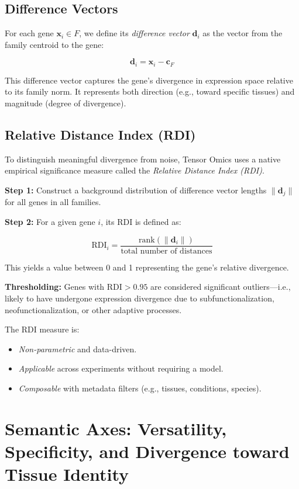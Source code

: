 \documentclass[11pt]{article}
\begin{document}
\subsection{Difference Vectors}

For each gene $\mathbf{x}_i \in F$, we define its \textit{difference vector} $\mathbf{d}_i$ as the vector from the family centroid to the gene:

\[
    \mathbf{d}_i = \mathbf{x}_i - \mathbf{c}_F
\]

This difference vector captures the gene’s divergence in expression space relative to its family norm. It represents both direction (e.g., toward specific tissues) and magnitude (degree of divergence).

\subsection{Relative Distance Index (RDI)}

To distinguish meaningful divergence from noise, Tensor Omics uses a native empirical significance measure called the \textit{Relative Distance Index (RDI)}.

\textbf{Step 1:} Construct a background distribution of difference vector lengths $\|\mathbf{d}_j\|$ for all genes in all families.

\textbf{Step 2:} For a given gene $i$, its RDI is defined as:

\[
    \text{RDI}_i = \frac{\text{rank}(\|\mathbf{d}_i\|)}{\text{total number of distances}}
\]

This yields a value between 0 and 1 representing the gene’s relative divergence.

\textbf{Thresholding:} Genes with $\text{RDI} > 0.95$ are considered significant outliers—i.e., likely to have undergone expression divergence due to subfunctionalization, neofunctionalization, or other adaptive processes.

The RDI measure is:
\begin{itemize}[leftmargin=1.5em]
    \item \textit{Non-parametric} and data-driven.
    \item \textit{Applicable} across experiments without requiring a model.
    \item \textit{Composable} with metadata filters (e.g., tissues, conditions, species).
\end{itemize}

\section{Semantic Axes: Versatility, Specificity, and Divergence toward Tissue Identity}
\end{document}
